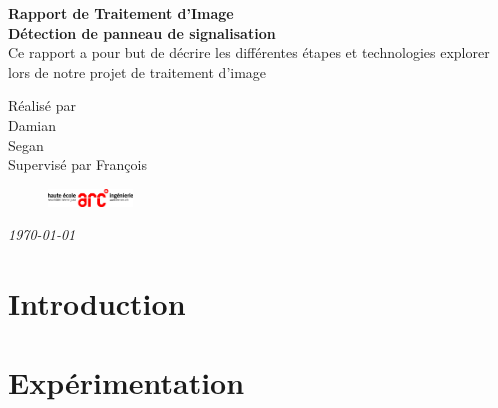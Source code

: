 \documentclass[a4paper,10pt,openany,oneside]{report}
\begin{document}
\thispagestyle{empty}
\vspace*{0.5cm}
\setlength{\parindent}{0cm}

\begin{center}
\textbf{\Large Rapport de Traitement d'Image}\\
\vspace*{3cm}
\textbf{\Huge Détection de panneau de signalisation}\\[3cm]
Ce rapport a pour but de décrire les différentes étapes et technologies explorer lors de notre projet de traitement d'image
\vspace*{3cm}

\large{Réalisé par\\
 \Large{Damian \\
 Segan }}\\[0.3cm]
\large{Supervisé par François }\\[5cm]
\begin{figure}[!h]
\centering
\includegraphics[width=0.2\textwidth]{../img/hearc.jpg}
\end{figure}
\textit{\today}\\[3cm]
\end{center}

\pagebreak


\titleformat{\chapter}[display]
{\normalfont\huge\bfseries}{\chaptertitlename\ \thechapter}{20pt}{\Huge}   
\titlespacing*{\chapter}{0pt}{-50pt}{40pt}
\setlength{\parindent}{1em}

\tableofcontents
\thispagestyle{empty}
\pagebreak
\setcounter{page}{1}


\chapter{Introduction}


\chapter{Expérimentation}
\end{document}
